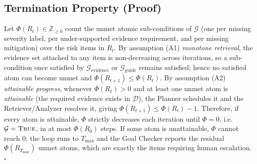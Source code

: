 \begin{table}[t!]
\centering
\caption{Evidence-omission risk under random and temporal calibration splits. Lower is better; values should be read as evidence-coverage risk, not severity-label correctness.}
\label{tab:risk_control_temporal}
\small
\setlength{\tabcolsep}{4pt}

\vspace{8pt}

\caption{Full VIGIL system under two backbones (mean $\pm$ std over runs). Baselines were not re-run on the open-weights stack.}
\label{tab:robustness}
\small
\setlength{\tabcolsep}{5pt}
\end{table}

\subsection{Termination Property (Proof)}
Let $\Phi(R_t)\in\mathbb{Z}_{\geq 0}$ count the unmet atomic sub-conditions of $\mathcal{G}$ (one per missing severity label, per under-supported evidence requirement, and per missing mitigation) over the risk items in $R_t$.
By assumption (A1) \emph{monotone retrieval}, the evidence set attached to any item is non-decreasing across iterations, so a sub-condition once satisfied by $\mathcal{G}_{\text{evidence}}$ or $\mathcal{G}_{\text{guide}}$ remains satisfied; hence no satisfied atom can become unmet and $\Phi(R_{t+1})\leq\Phi(R_t)$.
By assumption (A2) \emph{attainable progress}, whenever $\Phi(R_t)>0$ and at least one unmet atom is \emph{attainable} (the required evidence exists in $\mathcal{D}$), the Planner schedules it and the Retriever/Analyzer resolves it, giving $\Phi(R_{t+1})\leq\Phi(R_t)-1$.
Therefore, if every atom is attainable, $\Phi$ strictly decreases each iteration until $\Phi=0$, i.e.\ $\mathcal{G}=\textsc{True}$, in at most $\Phi(R_0)$ steps. If some atom is unattainable, $\Phi$ cannot reach $0$; the loop runs to $T_{\max}$ and the Goal Checker reports the residual $\Phi(R_{T_{\max}})$ unmet atoms, which are exactly the items requiring human escalation. \hfill$\square$

